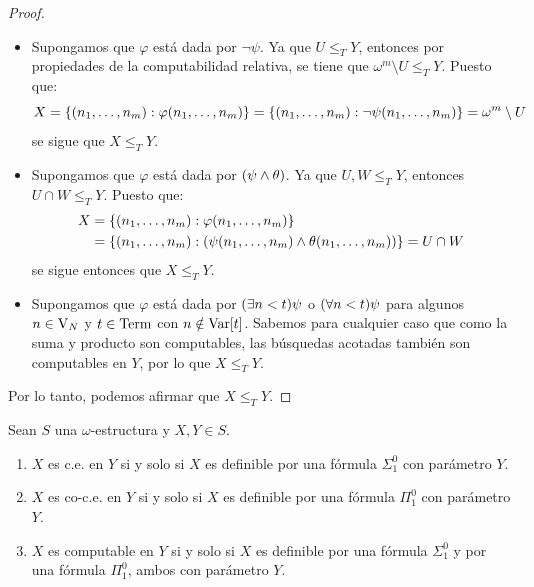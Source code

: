 \begin{proof}
\begin{itemize}
		\begin{itemize}
			\item Supongamos que $\varphi$ está dada por $\neg\psi$. Ya que $U\leq_{T} Y$, entonces por propiedades de la computabilidad relativa, se tiene que $\omega^{m}\setminus U\leq_{T} Y$. Puesto que:
			\[
				X =\set*{\pa*{n_{1},\dotsc, n_{m}}:\varphi\pa*{n_{1},\dotsc, n_{m}}} =\set*{\pa*{n_{1},\dotsc, n_{m}}:\neg\psi\pa*{n_{1},\dotsc, n_{m}}} =\omega^{m}\setminus U
			\]
			se sigue que $X\leq_{T} Y$.
			\item Supongamos que $\varphi$ está dada por $\pa*{\psi\land\theta}$. Ya que $U, W\leq_{T} Y$, entonces $U\cap W\leq_{T} Y$. Puesto que:
			\begin{align*}
				X &=\set*{\pa*{n_{1},\dotsc, n_{m}}:\varphi\pa*{n_{1},\dotsc, n_{m}}}\\
				&=\set*{\pa*{n_{1},\dotsc, n_{m}}:\pa*{\psi\pa*{n_{1},\dotsc, n_{m}}\land\theta\pa*{n_{1},\dotsc, n_{m}}}} = U\cap W
			\end{align*}
			se sigue entonces que $X\leq_{T} Y$.
			\item Supongamos que $\varphi$ está dada por $\pa*{\exists n < t}\psi$ o $\pa*{\forall n < t}\psi$ para algunos $n\in\VARIABLES[N]$ y $t\in\TERMINOS$ con $n\notin\mathrm{Var}\bra*{t}$. Sabemos para cualquier caso que como la suma y producto son computables, las búsquedas acotadas también son computables en $Y$, por lo que $X\leq_{T} Y$.
		\end{itemize}
	\end{itemize}

	Por lo tanto, podemos afirmar que $X\leq_{T} Y$.
\end{proof}

\begin{theorem}[Post]
	\label{theo: teorema_de_post}
	Sean $S$ una $\omega$-estructura y $X, Y\in S$.

	\begin{enumerate}
		\item $X$ es c.e. en $Y$ si y solo si $X$ es definible por una fórmula $\Sigma_{1}^{0}$ con parámetro $Y$.
		\item $X$ es co-c.e. en $Y$ si y solo si $X$ es definible por una fórmula $\Pi_{1}^{0}$ con parámetro $Y$.
		\item $X$ es computable en $Y$ si y solo si $X$ es definible por una fórmula $\Sigma_{1}^{0}$ y por una fórmula $\Pi_{1}^{0}$, ambos con parámetro $Y$.
	\end{enumerate}
\end{theorem}

